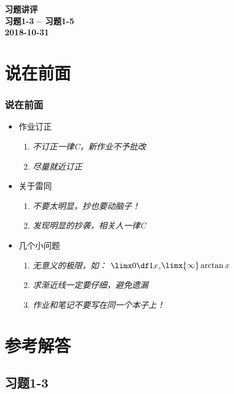 
\begin{frame}
	\centering
	\bf\Huge\color{purple} 习题讲评\\[1em]
	\small 习题1-3 -- 习题1-5\\[1cm]
	\small\color{gray}2018-10-31
\end{frame}

\section{说在前面}

\begin{frame}[t]\frametitle{说在前面}
	\linespread{1.8}
	\Large
	\vspace*{-1em}
    \begin{itemize}
    	\item 作业订正
    	\begin{enumerate}
    		\item {\it\Large\baa 不订正一律C，新作业不予批改}
    		\item {\it\Large 尽量就近订正}
    	\end{enumerate}
    	\item 关于雷同
    	\begin{enumerate}
    		\item {\it\Large 不要太明显，抄也要动脑子！}
    		\item {\it\Large\baa 发现明显的抄袭，相关人一律C}
    	\end{enumerate}
    	\item 几个小问题
    	\begin{enumerate}
    		\item {\it\Large 无意义的极限，如：
    		$\limx0\df1x$,$\limx{\infty}\arctan x$}
    		\item {\it\Large 求渐近线一定要仔细，避免遗漏}
    		\item {\it\Large 作业和笔记不要写在同一个本子上！}
    	\end{enumerate}
    \end{itemize}
\end{frame}

\section{参考解答}

\subsection{习题1-3}

